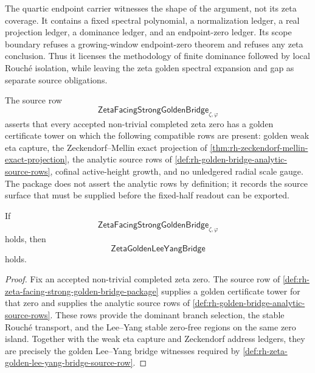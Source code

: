 \begin{principle}
\label{prin:rh-quartic-endpoint-as-finite-witness}
The quartic endpoint carrier witnesses the shape of the argument, not
its zeta coverage.  It contains a fixed spectral polynomial, a
normalization ledger, a real projection ledger, a dominance ledger, and
an endpoint-zero ledger.  Its scope boundary refuses a growing-window
endpoint-zero theorem and refuses any zeta conclusion.  Thus it licenses
the methodology of finite dominance followed by local Rouch\'e
isolation, while leaving the zeta golden spectral expansion and gap as
separate source obligations.
\end{principle}

\begin{definition}
\label{def:rh-zeta-facing-strong-golden-bridge-package}
The source row
$$
\mathsf{ZetaFacingStrongGoldenBridge}_{\zeta,\varphi}
$$
asserts that every accepted non-trivial completed zeta zero has a golden
certificate tower on which the following compatible rows are present:
golden weak eta capture, the Zeckendorf--Mellin exact projection of
\autoref{thm:rh-zeckendorf-mellin-exact-projection},
the analytic source rows of
\autoref{def:rh-golden-bridge-analytic-source-rows}, cofinal
active-height growth, and no unledgered radial scale gauge.  The package
does not assert the analytic rows by definition; it records the source
surface that must be supplied before the fixed-half readout can be
exported.
\end{definition}

\begin{theorem}
\label{thm:rh-strong-golden-bridge-gives-zeta-lee-yang-bridge}
If
$$
\mathsf{ZetaFacingStrongGoldenBridge}_{\zeta,\varphi}
$$
holds, then
$$
\mathsf{ZetaGoldenLeeYangBridge}
$$
holds.
\end{theorem}

\begin{proof}
Fix an accepted non-trivial completed zeta zero.  The source row of
\autoref{def:rh-zeta-facing-strong-golden-bridge-package} supplies a
golden certificate tower for that zero and supplies the analytic source
rows of \autoref{def:rh-golden-bridge-analytic-source-rows}.  These rows
provide the dominant branch selection, the stable Rouch\'e transport,
and the Lee--Yang stable zero-free regions on the same zero island.
Together with the weak eta capture and Zeckendorf address ledgers, they
are precisely the golden Lee--Yang bridge witnesses required by
\autoref{def:rh-zeta-golden-lee-yang-bridge-source-row}.
\end{proof}


